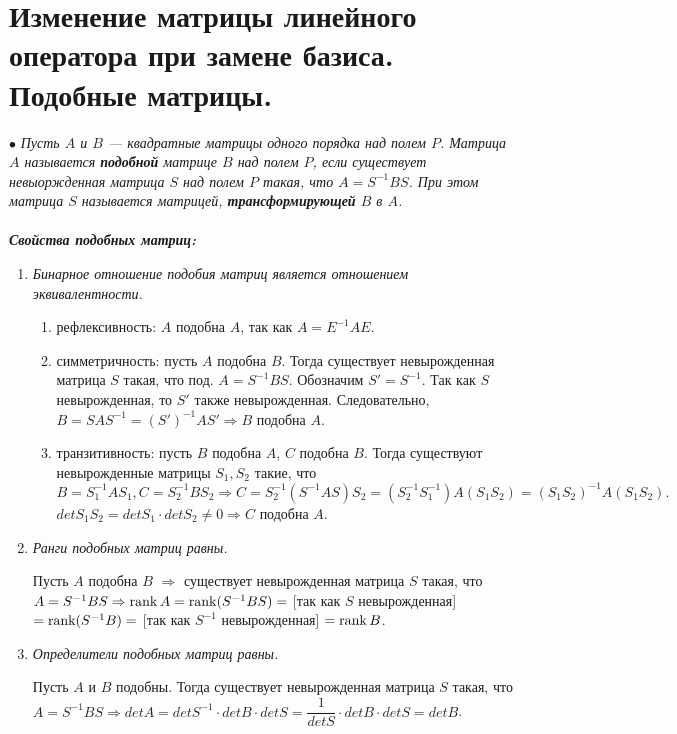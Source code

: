 \section{Изменение матрицы линейного оператора при замене базиса. Подобные матрицы.}
$\bullet$ \textit{Пусть $A$ и $B$ --- квадратные матрицы одного порядка над полем $P$. Матрица $A$ называется \textbf{подобной} матрице $B$ над полем $P$, если существует невыоржденная матрица $S$ над полем $P$ такая, что $A = S^{-1}BS$. При этом матрица $S$ называется матрицей, \textbf{трансформирующей} $B$ в $A$.}\\\\
\textit{ \textbf{Свойства подобных матриц:}}
\begin{enumerate}
	\item \textit{Бинарное отношение подобия матриц является отношением эквивалентности.}\begin{Proof}\begin{enumerate}
			\item рефлексивность: $A$ подобна $A$, так как $A = E^{-1}AE$.
			\item симметричность: пусть $A$ подобна $B$. Тогда существует невырожденная матрица $S$ такая, что под. $A = S^{-1}BS$. Обозначим $S' = S^{-1}$. Так как $S$ невырожденная, то $S'$ также невырожденная. Следовательно, $B = S A S^{-1} = (S')^{-1} A S' \Rightarrow B$ подобна $A$.
			\item транзитивность: пусть $B$ подобна $A$, $C$ подобна $B$. Тогда существуют невырожденные матрицы $S_1, S_2$ такие, что $B = S_1^{-1}AS_1, C = S_2^{-1}BS_2\Rightarrow C = S_2^{-1}(S^{-1}AS)S_2= (S_2^{-1}S_1^{-1})A(S_1S_2) = (S_1S_2)^{-1}A(S_1S_2).$ $detS_1S_2 = detS_1\cdot detS_2 \ne 0\Rightarrow C$ подобна $A$.
		\end{enumerate}
	\end{Proof}
	\item \textit{Ранги подобных матриц равны.}\begin{Proof}
		Пусть $A$ подобна $B$ $\Rightarrow$ существует невырожденная матрица $S$ такая, что $A = S^{-1} B S \Rightarrow \operatorname{rank}  A = \operatorname{rank}   (S^{-1} B S ) =$ [так как $S$ невырожденная] $ = \operatorname{rank}  (S^{-1} B) =$ [так как $S^{-1}$ невырожденная] $= \operatorname{rank}  B$.
	\end{Proof}
	\item \textit {Определители подобных матриц равны.}\begin{Proof}
		Пусть $A$ и $B$ подобны. Тогда существует невырожденная матрица $S$ такая, что $A = S^{-1}BS\Rightarrow det A = detS^{-1}\cdot det B\cdot detS = \dfrac{1}{detS}\cdot detB\cdot detS = det B$.
\end{Proof}\end{enumerate}
